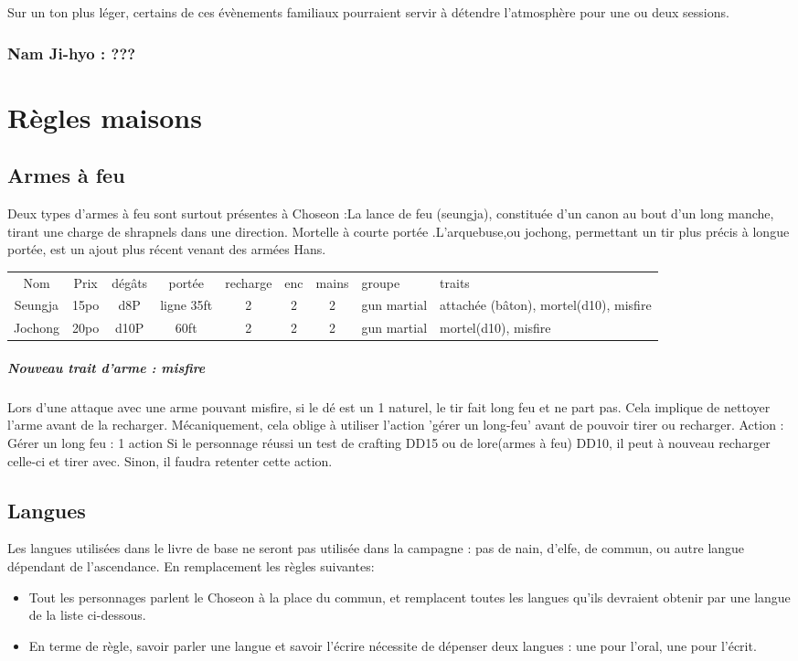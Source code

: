 \documentclass[10pt,a4paper]{book}
\begin{document}
Sur un ton plus léger, certains de ces évènements familiaux pourraient servir à détendre l'atmosphère pour une ou deux sessions.
\subsection{Nam Ji-hyo : ???}
\chapter{Règles maisons}
\section{Armes à feu}
Deux types d'armes à feu sont surtout présentes à Choseon :La lance de feu (seungja), constituée d'un canon au bout d'un long manche, tirant une charge de shrapnels dans une direction. Mortelle à courte portée .L'arquebuse,ou jochong, permettant un tir plus précis à longue portée, est un ajout plus récent venant des armées Hans.

\flushleft
\begin{tabular}{c c c c c c c p{} p{}}
Nom & Prix & dégâts & portée & recharge & enc & mains & groupe & traits \\
Seungja & 15po & d8P & ligne 35ft & 2 & 2 & 2 & gun martial & attachée (bâton), mortel(d10), misfire \\
Jochong & 20po & d10P & 60ft & 2 & 2 & 2 & gun martial & mortel(d10), misfire\\
\end{tabular}


\paragraph{Nouveau trait d'arme : misfire}
Lors d'une attaque avec une arme pouvant misfire, si le dé est un 1 naturel, le tir fait long feu et ne part pas. Cela implique de nettoyer l'arme avant de la recharger. Mécaniquement, cela oblige à utiliser l'action 'gérer un long-feu' avant de pouvoir tirer ou recharger.
Action :
Gérer un long feu : 1 action
Si le personnage réussi un test de crafting DD15 ou de lore(armes à feu) DD10, il peut à nouveau recharger celle-ci et tirer avec. Sinon, il faudra retenter cette action.

\section{Langues}

Les langues utilisées dans le livre de base ne seront pas utilisée dans la campagne : pas de nain, d'elfe, de commun, ou autre langue dépendant de l'ascendance.
En remplacement les règles suivantes:
\begin{itemize}
\item Tout les personnages parlent le Choseon à la place du commun, et remplacent toutes les langues qu'ils devraient obtenir par une langue de la liste ci-dessous.
\item En terme de règle, savoir parler une langue et savoir l'écrire nécessite de dépenser deux langues : une pour l'oral, une pour l'écrit. 
\end{itemize}
\end{document}
